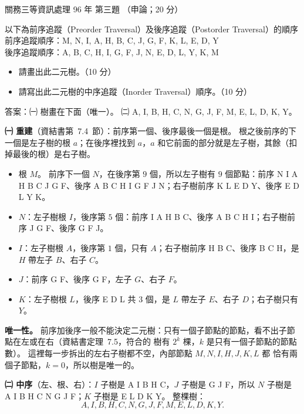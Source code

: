\begin{pastexam}[label={px:gw3-096-ds-03}]{關務三等資訊處理 96 年 第三題}
（申論；20 分）

以下為前序追蹤（Preorder Traversal）及後序追蹤（Postorder Traversal）的順序\\
前序追蹤順序：M, N, I, A, H, B, C, J, G, F, K, L, E, D, Y\\
後序追蹤順序：A, B, C, H, I, G, F, J, N, E, D, L, Y, K, M
\begin{itemize}[leftmargin=2.2em, nosep]
\item[㈠] 請畫出此二元樹。（10 分）
\item[㈡] 請寫出此二元樹的中序追蹤（Inorder Traversal）順序。（10 分）
\end{itemize}
\end{pastexam}

\begin{pastsoln}
答案：㈠ 樹畫在下面（唯一）。 ㈡ A, I, B, H, C, N, G, J, F, M, E, L, D, K, Y。

\textbf{㈠ 重建}（資結書第~7.4~節）：前序第一個、後序最後一個是根。 根之後前序的下一個是左子樹的根 $a$；在後序裡找到
$a$，$a$ 和它前面的部分就是左子樹，其餘（扣掉最後的根）是右子樹。
\begin{itemize}
\item 根 $M$。 前序下一個 $N$，在後序第 $9$ 個，所以左子樹有 $9$ 個節點：前序 N I A H B C J G F、後序
A B C H I G F J N；右子樹前序 K L E D Y、後序 E D L Y K。
\item $N$：左子樹根 $I$，後序第 $5$ 個：前序 I A H B C、後序 A B C H I；右子樹前序 J G F、後序 G F J。
\item $I$：左子樹根 $A$，後序第 $1$ 個，只有 $A$；右子樹前序 H B C、後序 B C H，是 $H$ 帶左子 $B$、右子 $C$。
\item $J$：前序 G F、後序 G F，左子 $G$、右子 $F$。
\item $K$：左子樹根 $L$，後序 E D L 共 $3$ 個，是 $L$ 帶左子 $E$、右子 $D$；右子樹只有 $Y$。
\end{itemize}
\begin{center}
\end{center}
\textbf{唯一性。} 前序加後序一般不能決定二元樹：只有一個子節點的節點，看不出子節點在左或在右（資結書定理~7.5，符合的
樹有 $2^{k}$ 棵，$k$ 是只有一個子節點的節點數）。 這裡每一步拆出的左右子樹都不空，內部節點 $M, N, I, H, J, K, L$ 都
恰有兩個子節點，$k = 0$，所以樹是唯一的。

\textbf{㈡ 中序}（左、根、右）：$I$ 子樹是 A I B H C，$J$ 子樹是 G J F，所以 $N$ 子樹是 A I B H C N G J F；$K$ 子樹是
E L D K Y。 整棵樹：
\[
A, I, B, H, C, N, G, J, F, M, E, L, D, K, Y.
\]
\end{pastsoln}
